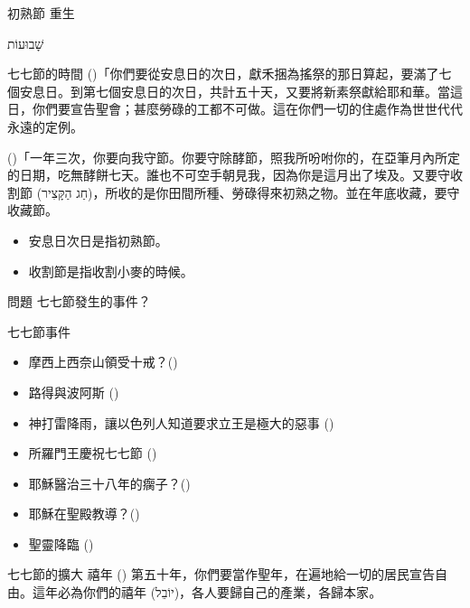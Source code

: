 \documentclass{beamer}
\newcommand{\topic}[1]{
  \begin{frame}
    \centering
    \vspace*{1cm}
    {\fontsize{40}{48}\selectfont #1\par}
    \vfill
  \end{frame}
}
\newcommand{\question}[1]{
  \begin{frame}{問題}
    \centering
    \vspace*{1cm}
    \huge #1？\par
    \vfill
  \end{frame}
}
\newcommand{\conclusion}[2]{
  \begin{frame}
    \centering
    \vspace*{1cm}
    {\fontsize{40}{48}\selectfont #1 \textemdash #2\par}
    \vfill
  \end{frame}
}
\newcommand{\parvspace}{\par\vspace{0.5em}}
\begin{document}
\conclusion{初熟節}{重生}

\topic{\texthebrew{שָׁבוּעוֹת}}

\begin{frame}{七七節的時間}
  ()「你們要從\alert{安息日的次日}，獻禾捆為搖祭的那日算起，要\alert{滿了七個安息日}。到\alert{第七個安息日的次日，共計五十天}，又要將新素祭獻給耶和華。\textellipsis{}當這日，你們要宣告聖會；\alert{甚麼勞碌的工都不可做}。這在你們一切的住處作為世世代代永遠的定例。\parvspace
  ()「一年三次，你要向我守節。你要守除酵節，照我所吩咐你的，在亞筆月內所定的日期，吃無酵餅七天。誰也不可空手朝見我，因為你是這月出了埃及。又要守\alert{收割節 (\texthebrew{חַג הַקָּצִיר})}，所收的是你田間所種、勞碌得來初熟之物。並在年底收藏，要守收藏節。\parvspace
  \begin{itemize}
    \item 安息日次日是指初熟節。
    \item 收割節是指收割小麥的時候。
  \end{itemize}
\end{frame}

\question{七七節發生的事件}

\begin{frame}{七七節事件}
  \begin{itemize}
    \item 摩西上西奈山領受十戒？()\parencite{TenCommandmentsOnShavuot}
    \item 路得與波阿斯 ()
    \item 神打雷降雨，讓以色列人知道要求立王是極大的惡事 ()
    \item 所羅門王慶祝七七節 ()
    \item 耶穌醫治三十八年的瘸子？()\parencite{YeshuaHealsInShavuot}
    \item 耶穌在聖殿教導？()\parencite{ YeshuaTeachesInShavuot}
    \item 聖靈降臨 ()
  \end{itemize}
\end{frame}

\begin{frame}{七七節的擴大 \textemdash 禧年}
  () 第五十年，你們要當作\alert{聖年}，在遍地給一切的居民\alert{宣告自由}。這年必為你們的禧年 (\texthebrew{יוֹבֵל})，各人要\alert{歸自己的產業}，\alert{各歸本家}。
\end{frame}
\end{document}

